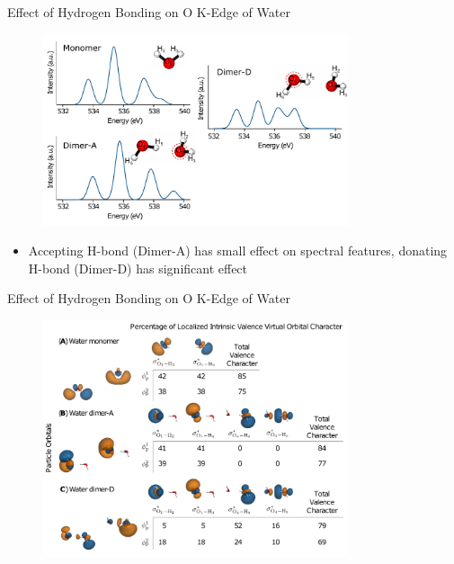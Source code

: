 \documentclass[t]{beamer}
\begin{document}
\begin{frame}{Effect of Hydrogen Bonding on O K-Edge of Water}
\begin{figure}
\includegraphics[width=0.8\textwidth]{water_spectra_slide.pdf}
\end{figure}
\begin{itemize}
\item Accepting H-bond (Dimer-A) has small effect on spectral features, donating H-bond (Dimer-D) has significant effect
\end{itemize}
\end{frame}

\begin{frame}{Effect of Hydrogen Bonding on O K-Edge of Water}
\begin{figure}
\includegraphics[width=0.8\textwidth]{water_livvo_slide.png}
\end{figure}
\end{frame}
\end{document}
